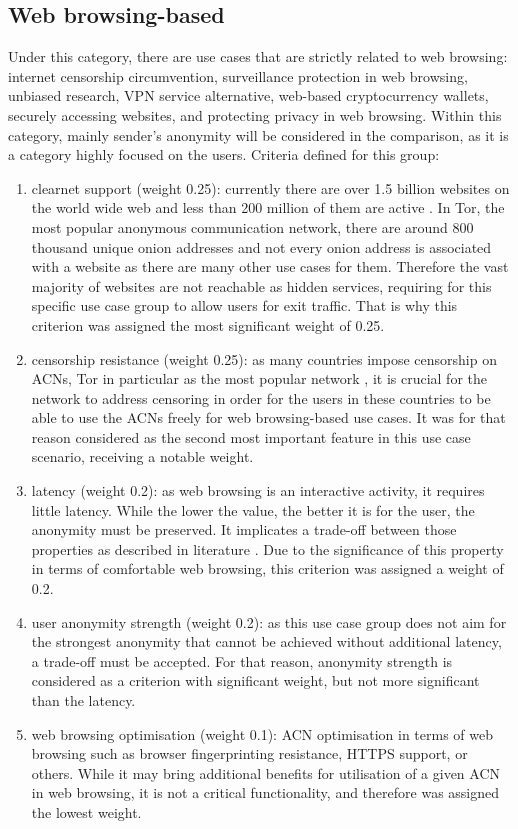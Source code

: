 \subsection{Web browsing-based}
Under this category, there are use cases that are strictly related to web browsing: internet censorship circumvention, surveillance protection in web browsing, unbiased research, VPN service alternative, web-based cryptocurrency wallets, securely accessing websites, and protecting privacy in web browsing.
Within this category, mainly sender’s anonymity will be considered in the comparison, as it is a category highly focused on the users.
Criteria defined for this group:
\begin{enumerate}
    \item clearnet support (weight 0.25): currently there are over 1.5 billion websites on the world wide web and less than 200 million of them are active \cite{internetlivestats}. In Tor, the most popular anonymous communication network, there are around 800 thousand unique onion addresses \cite{tor-metrics, tor-metrics2} and not every onion address is associated with a website as there are many other use cases for them. Therefore the vast majority of websites are not reachable as hidden services, requiring for this specific use case group to allow users for exit traffic. That is why this criterion was assigned the most significant weight of 0.25.
    \item censorship resistance (weight 0.25): as many countries impose censorship on ACNs, Tor in particular as the most popular network \cite{gfw-china, africa}, it is crucial for the network to address censoring in order for the users in these countries to be able to use the ACNs freely for web browsing-based use cases. It was for that reason considered as the second most important feature in this use case scenario, receiving a notable weight.
    \item latency (weight 0.2): as web browsing is an interactive activity, it requires little latency. While the lower the value, the better it is for the user, the anonymity must be preserved. It implicates a trade-off between those properties as described in literature \cite{tor-design}. Due to the significance of this property in terms of comfortable web browsing, this criterion was assigned a weight of 0.2.
    \item user anonymity strength (weight 0.2): as this use case group does not aim for the strongest anonymity that cannot be achieved without additional latency, a trade-off must be accepted. For that reason, anonymity strength is considered as a criterion with significant weight, but not more significant than the latency.
    \item web browsing optimisation (weight 0.1): ACN optimisation in terms of web browsing such as browser fingerprinting resistance, HTTPS support, or others. While it may bring additional benefits for utilisation of a given ACN in web browsing, it is not a critical functionality, and therefore was assigned the lowest weight.
\end{enumerate}


